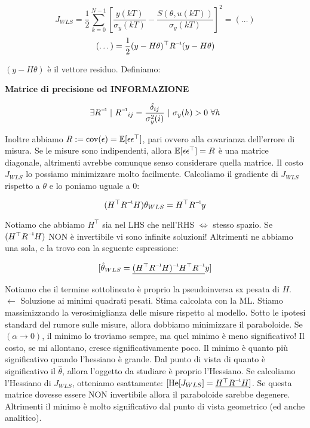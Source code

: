 \[
	J_{WLS} = \frac{1}{2}\sum_{k=0}^{N-1}{[\frac{y(kT)}{\sigma_y(kT)} - \frac{S(\theta,u(kT))}{\sigma_y(kT)}]^2} = (\dots)
\]
\[
	(\dots) = \frac{1}{2}(y-H\theta)^\top\inv{R}(y-H\theta)
\]

$(y-H\theta)$ è il vettore residuo. Definiamo:

\begin{defn}{\textbf{Matrice di precisione od INFORMAZIONE}}

\[
	\exists\inv{R}\ |\ \inv{R}_{ij} = \frac{\delta_{ij}}{\sigma_y^2(i)}\ |\ \sigma_y(h)>0\ \forall h
\]

\end{defn}

Inoltre abbiamo $R := \operatorname{cov}(\epsilon) = \operatorname{\mathbb{E}}[\epsilon\epsilon^\top]$, pari ovvero alla covarianza dell'errore di misura. Se le misure sono indipendenti, allora $\operatorname{\mathbb{E}}[\epsilon\epsilon^\top]=R$ è una matrice diagonale, altrimenti avrebbe comunque senso considerare quella matrice. Il costo $J_{WLS}$ lo possiamo minimizzare molto facilmente. Calcoliamo il gradiente di $J_{WLS}$ rispetto a $\theta$ e lo poniamo uguale a 0:

\[
	(H^\top\inv{R}H)\theta_{WLS} = H^\top\inv{R}y
\]

Notiamo che abbiamo $H^\top$ sia nel LHS che nell'RHS $\iff$ stesso spazio. Se $(H^\top\inv{R}H)$ NON è invertibile vi sono infinite soluzioni! Altrimenti ne abbiamo una sola, e la trovo con la seguente espressione:

\[
	[\hat{\theta}_{WLS} = \underline{\inv{(H^\top\inv{R}H)}H^\top\inv{R}}y]
\]

Notiamo che il termine sottolineato è proprio la pseudoinversa sx pesata di $H$. $\leftarrow$ Soluzione ai minimi quadrati pesati. Stima calcolata con la ML. Stiamo massimizzando la verosimiglianza delle misure rispetto al modello. Sotto le ipotesi standard del rumore sulle misure, allora dobbiamo minimizzare il paraboloide. Se $(\alpha\to 0)$, il minimo lo troviamo sempre, ma quel minimo è meno significativo! Il costo, se mi allontano, cresce significativamente poco. Il minimo è quanto più significativo quando l'hessiano è grande. Dal punto di vista di quanto è significativo il $\hat{\theta}$, allora l'oggetto da studiare è proprio l'Hessiano. Se calcoliamo l'Hessiano di $J_{WLS}$, otteniamo esattamente: $[\He[J_{WLS}] = \underline{H^\top\inv{R}H}]$. Se questa matrice dovesse essere NON invertibile allora il paraboloide sarebbe degenere. Altrimenti il minimo è molto significativo dal punto di vista geometrico (ed anche analitico).

